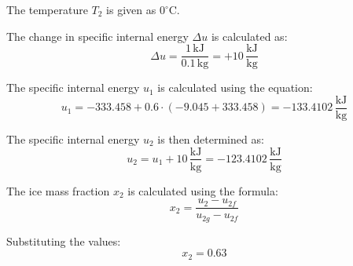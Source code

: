 The temperature \( T_2 \) is given as \( 0^\circ\text{C} \).  

The change in specific internal energy \( \Delta u \) is calculated as:  
\[
\Delta u = \frac{1 \, \text{kJ}}{0.1 \, \text{kg}} = +10 \, \frac{\text{kJ}}{\text{kg}}
\]

The specific internal energy \( u_1 \) is calculated using the equation:  
\[
u_1 = -333.458 + 0.6 \cdot (-9.045 + 333.458) = -133.4102 \, \frac{\text{kJ}}{\text{kg}}
\]

The specific internal energy \( u_2 \) is then determined as:  
\[
u_2 = u_1 + 10 \, \frac{\text{kJ}}{\text{kg}} = -123.4102 \, \frac{\text{kJ}}{\text{kg}}
\]

The ice mass fraction \( x_2 \) is calculated using the formula:  
\[
x_2 = \frac{u_2 - u_{2f}}{u_{2g} - u_{2f}}
\]

Substituting the values:  
\[
x_2 = 0.63
\]